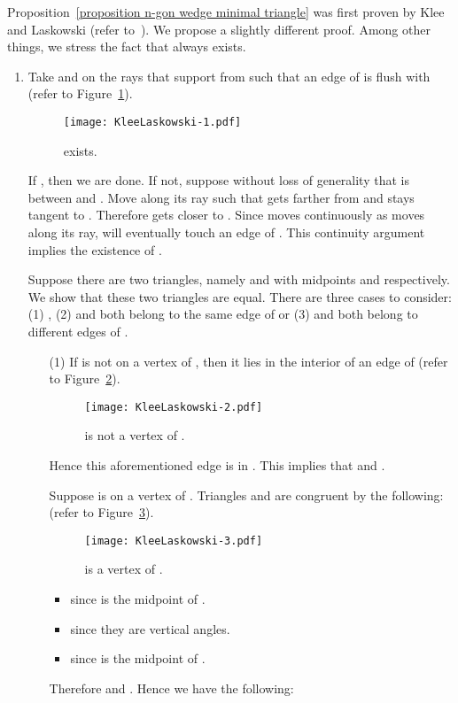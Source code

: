 \documentclass[11pt, oneside]{article}
\begin{document}
Proposition~\ref{proposition n-gon wedge minimal triangle}
was first proven by Klee and Laskowski
(refer to~\cite[Lemma~1.2]{DBLP:journals/jal/KleeL85}).
We propose a slightly different proof.
Among other things,
we stress the fact that  always exists.
\proof\
\begin{enumerate}
\item Take  and  on the rays that support  from 
such that an edge  of  is flush with 
(refer to Figure~\ref{figure KleeLaskowski-1}).
\begin{figure}
\centering
\texttt{[image: KleeLaskowski-1.pdf]}
\caption{ exists.\label{figure KleeLaskowski-1}}
\end{figure}
If , 
then we are done.
If not,
suppose without loss of generality
that  is between  and .
Move  along its ray such that
 gets farther from  
and  stays tangent to .
Therefore  gets closer to .
Since  moves continuously
as  moves along its ray,
 will eventually touch an edge of .
This continuity argument implies the existence of .

Suppose there are two triangles,
namely  and 
with midpoints  and  respectively.
We show that these two triangles are equal.
There are three cases to consider:
(1) ,
(2)  and both belong to the same edge of 
or (3)  and both belong to different edges of .

\begin{enumerate}
\item[(1)]
If  is not on a vertex of ,
then it lies in the interior of an edge of 
(refer to Figure~\ref{figure KleeLaskowski-2}).
\begin{figure}
\centering
\texttt{[image: KleeLaskowski-2.pdf]}
\caption{ is not a vertex of .\label{figure KleeLaskowski-2}}
\end{figure}
Hence this aforementioned edge is in .
This implies that  and .

Suppose  is on a vertex of .
Triangles  and  are congruent by the following:
(refer to Figure~\ref{figure KleeLaskowski-3}).
\begin{figure}
\centering
\texttt{[image: KleeLaskowski-3.pdf]}
\caption{ is a vertex of .\label{figure KleeLaskowski-3}}
\end{figure}
\begin{itemize}
\item  since  is the midpoint of .

\item  since they are vertical angles.

\item  since  is the midpoint of .
\end{itemize}
Therefore 
and .
Hence we have the following:


\end{enumerate}
\end{enumerate}
\end{document}
